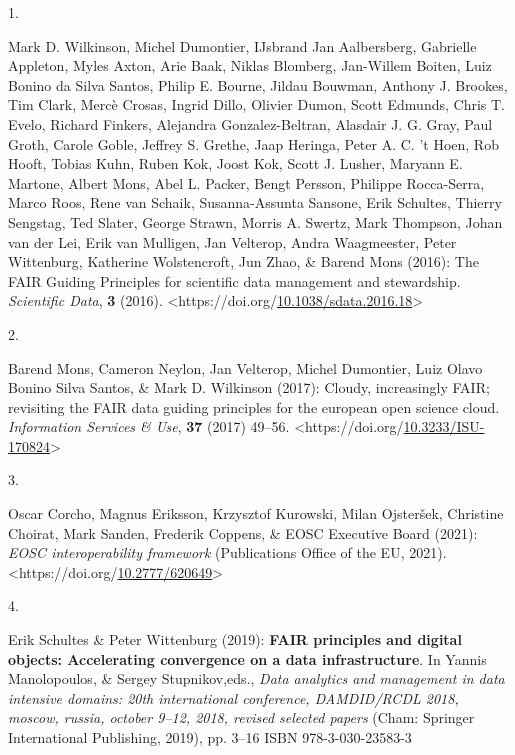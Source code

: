 \begin{thebibliography}{9}


1.

Mark D. Wilkinson, Michel Dumontier, IJsbrand Jan Aalbersberg, Gabrielle
Appleton, Myles Axton, Arie Baak, Niklas Blomberg, Jan-Willem Boiten,
Luiz Bonino da Silva Santos, Philip E. Bourne, Jildau Bouwman, Anthony
J. Brookes, Tim Clark, Mercè Crosas, Ingrid Dillo, Olivier Dumon, Scott
Edmunds, Chris T. Evelo, Richard Finkers, Alejandra Gonzalez-Beltran,
Alasdair J. G. Gray, Paul Groth, Carole Goble, Jeffrey S. Grethe, Jaap
Heringa, Peter A. C. 't Hoen, Rob Hooft, Tobias Kuhn, Ruben Kok, Joost
Kok, Scott J. Lusher, Maryann E. Martone, Albert Mons, Abel L. Packer,
Bengt Persson, Philippe Rocca-Serra, Marco Roos, Rene van Schaik,
Susanna-Assunta Sansone, Erik Schultes, Thierry Sengstag, Ted Slater,
George Strawn, Morris A. Swertz, Mark Thompson, Johan van der Lei, Erik
van Mulligen, Jan Velterop, Andra Waagmeester, Peter Wittenburg,
Katherine Wolstencroft, Jun Zhao, \& Barend Mons (2016): The {FAIR
Guiding Principles} for scientific data management and stewardship.
\emph{Scientific Data}, \textbf{3} (2016).
\textless https://doi.org/\href{https://doi.org/10.1038/sdata.2016.18}{10.1038/sdata.2016.18}\textgreater{}

\hypertarget{ref-monsCloudyIncreasinglyFAIR2017b}{}
2.

Barend Mons, Cameron Neylon, Jan Velterop, Michel Dumontier, Luiz Olavo
Bonino Silva Santos, \& Mark D. Wilkinson (2017): Cloudy, increasingly
{FAIR}; revisiting the {FAIR} data guiding principles for the european
open science cloud. \emph{Information Services \& Use}, \textbf{37}
(2017) 49--56.
\textless https://doi.org/\href{https://doi.org/10.3233/ISU-170824}{10.3233/ISU-170824}\textgreater{}

\hypertarget{ref-corchoEOSCInteroperabilityFramework2021b}{}
3.

Oscar Corcho, Magnus Eriksson, Krzysztof Kurowski, Milan Ojsteršek,
Christine Choirat, Mark Sanden, Frederik Coppens, \& EOSC Executive
Board (2021): \emph{{EOSC} interoperability framework} ({Publications
Office of the EU}, 2021).
\textless https://doi.org/\href{https://doi.org/10.2777/620649}{10.2777/620649}\textgreater{}

\hypertarget{ref-schultesFAIRPrinciplesDigital2019a}{}
4.

Erik Schultes \& Peter Wittenburg (2019): \textbf{{FAIR} principles and
digital objects: {Accelerating} convergence on a data infrastructure}.
In Yannis Manolopoulos, \& Sergey Stupnikov,eds., \emph{Data analytics
and management in data intensive domains: 20th international conference,
{DAMDID}/{RCDL} 2018, moscow, russia, october 9--12, 2018, revised
selected papers} ({Cham}: {Springer International Publishing}, 2019),
pp. 3--16 ISBN 978-3-030-23583-3


\end{thebibliography}
